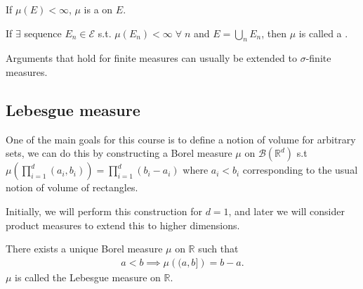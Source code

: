 \begin{definition}
	If $\mu(E) < \infty$, $\mu$ is a  on $E$.
\end{definition}

\begin{definition}
	If $\exists$ sequence $E_n \in \mathcal{E}$ s.t. $\mu(E_n) < \infty \; \forall \; n$ and $E = \bigcup_n E_n$, then $\mu$ is called a .
\end{definition}

\begin{remark}
	Arguments that hold for finite measures can usually be extended to $\sigma$-finite measures.
\end{remark}

\subsection{Lebesgue measure}
One of the main goals for this course is to define a notion of volume for arbitrary sets, we can do this by constructing a Borel measure $\mu$ on $\mathcal{B}(\mathbb{R}^d)$ s.t $\mu \left( \prod_{i=1}^d (a_i, b_i) \right) = \prod_{i=1}^d (b_i - a_i)$ where $a_i < b_i$ corresponding to the usual notion of volume of rectangles.

Initially, we will perform this construction for $d = 1$, and later we will consider product measures to extend this to higher dimensions.

\begin{theorem}
	There exists a unique Borel measure $\mu$ on $\mathbb R$ such that
	\begin{align*}
		a < b \implies \mu \left( (a,b] \right) = b - a. \tag{$\dagger$}
	\end{align*}
	$\mu$ is called the Lebesgue measure on $\mathbb{R}$.
\end{theorem}


